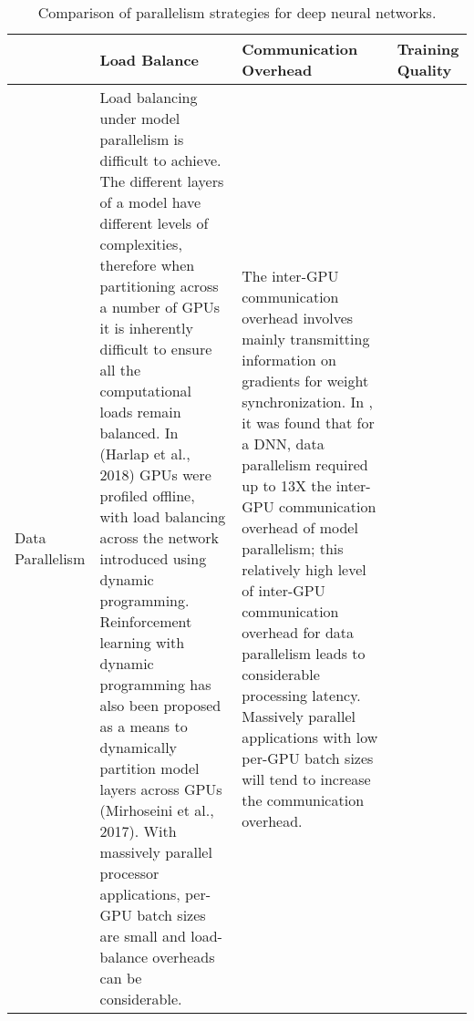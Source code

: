 \documentclass[10pt]{article}[draft]
\newlength\mylen
\begin{document}
\begin{table}[htbpp]
	\small
	\setlength\tabcolsep{3pt} %
	\captionsetup{font=small,skip=0.333\baselineskip}
	\caption{Comparison of parallelism strategies for deep neural networks.} \label{T2.6}
	
	\begin{center}
		\begin{tabularx}{\textwidth}{@{} p{\mylen} LLL @{}}
			\toprule
			& 
			Load Balance  & 
			Communication Overhead& 
			Training Quality \\ 
			\midrule
			Data Parallelism & 
			Load balancing under model parallelism is difficult to achieve. The different layers of a model have different levels of complexities, therefore  when partitioning across a number of GPUs it is inherently difficult to ensure all the computational loads remain balanced. In (Harlap et al., 2018)  GPUs were profiled offline, with load balancing  across the network   introduced  using dynamic programming.  Reinforcement learning with dynamic programming has  also been proposed as a means to  dynamically partition  model layers across GPUs (Mirhoseini et al., 2017). With massively parallel processor applications, per-GPU batch sizes are small and load-balance overheads can be considerable. & 
			The inter-GPU communication overhead involves mainly transmitting information on  gradients for weight synchronization. In \cite{https://arxiv.org/pdf/1809.02839.pdf}, it was found that for a DNN, data parallelism required up to 13X the inter-GPU communication overhead of model parallelism; this relatively high level of inter-GPU communication overhead for data parallelism
			leads to considerable processing latency. Massively parallel applications with low per-GPU batch sizes will tend to increase the communication overhead.
			

\end{tabularx}
\end{center}
\end{table}
\end{document}
